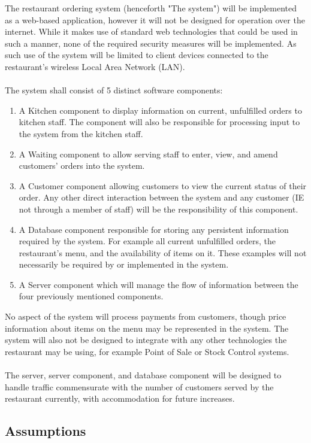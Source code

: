 \documentclass[11pt, a4paper]{article}
\begin{document}
The restaurant ordering system (henceforth "The system") will be implemented as a web-based application, however it will not be designed for operation over the internet. While it makes use of standard web technologies that could be used in such a manner, none of the required security measures will be implemented. As such use of the system will be limited to client devices connected to the restaurant's wireless Local Area Network (LAN).\\
\\
The system shall consist of 5 distinct software components:
\begin{enumerate}
\item A Kitchen component to display information on current, unfulfilled orders to kitchen staff. The component will also be responsible for processing input to the system from the kitchen staff.
\item A Waiting component to allow serving staff to enter, view, and amend customers' orders into the system.
\item A Customer component allowing customers to view the current status of their order. Any other direct interaction between the system and any customer (IE not through a member of staff) will be the responsibility of this component.
\item A Database component responsible for storing any persistent information required by the system. For example all current unfulfilled orders, the restaurant's menu, and the availability of items on it. These examples will not necessarily be required by or implemented in the system.
\item A Server component which will manage the flow of information between the four previously mentioned components.
\end{enumerate} 
\noindent
No aspect of the system will process payments from customers, though price information about items on the menu may be represented in the system. The system will also not be designed to integrate with any other technologies the restaurant may be using, for example Point of Sale or Stock Control systems.\\
\\
The server, server component, and database component will be designed to handle traffic commensurate with the number of customers served by the restaurant currently, with accommodation for future increases.

\subsection{Assumptions} \label{subsec:Assumptions}
\end{document}
